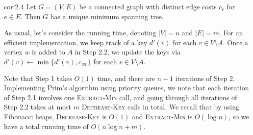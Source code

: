 \begin{cor}{cor:2.4}
    Let $G = (V, E)$ be a connected graph with distinct edge costs $c_e$ for 
    $e \in E$. Then $G$ has a unique minimum spanning tree.
\end{cor}

As usual, let's consider the running time, denoting $|V| = n$ 
and $|E| = m$. For an efficient implementation, 
we keep track of a key $d'(v)$ for each $v \in V \setminus A$. 
Once a vertex $w$ is added to $A$ in Step 2.2, we update the keys via 
$d'(v) \gets \min\{d'(v), c_{wv}\}$ for each $v \in V \setminus A$. 

Note that Step 1 takes $O(1)$ time, and 
there are $n-1$ iterations of Step 2. Implementing Prim's algorithm 
using priority queues, we note that each iteration of Step 2.1 
involves one \textsc{Extract-Min} call, and 
going through all iterations of Step 2.2 takes at most $m$ 
\textsc{Decrease-Key} calls in total. We recall that by using Fibonacci heaps, 
\textsc{Decrease-Key} is $O(1)$ and \textsc{Extract-Min} is $O(\log n)$, 
so we have a total running time of $O(n\log n + m)$. 